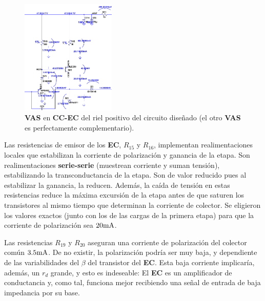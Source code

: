 \begin{figure}
  \begin{center}
   \includegraphics[width=0.4\textwidth]{img/vas-1.png}
   \caption{\textbf{VAS} en \textbf{CC-EC} del riel positivo del circuito diseñado (el otro \textbf{VAS} es perfectamente complementario).}
   \label{fig:vas-1} 
  \end{center}   
\end{figure}




Las resistencias de emisor de los \textbf{EC}, $R_{15}$ y $R_{16}$, implementan realimentaciones locales que estabilizan la corriente de polarización y ganancia de la etapa. Son realimentaciones \textbf{serie-serie} (muestrean corriente y suman tensión), estabilizando la transconductancia de la etapa. Son de valor reducido pues al estabilizar la ganancia, la reducen. Además, la caída de tensión en estas resistencias reduce la máxima excursión de la etapa antes de que saturen los transistores al mismo tiempo que determinan la corriente de colector. Se eligieron los valores exactos (junto con los de las cargas de la primera etapa) para que la corriente de polarización sea $20 \si[per-mode=symbol]{\milli\ampere}$.

Las resistencias $R_{19}$ y $R_{20}$ aseguran una corriente de polarización del colector común $3.5 \si[per-mode=symbol]{\milli\ampere}$. De no existir, la polarización podría ser muy baja, y dependiente de las variabilidades del $\beta$ del transistor del \textbf{EC}. Esta baja corriente implicaría, además, un $r_{d}$ grande, y esto es indeseable: El \textbf{EC} es un amplificador de conductancia y, como tal, funciona mejor recibiendo una señal de entrada de baja impedancia por su base.


